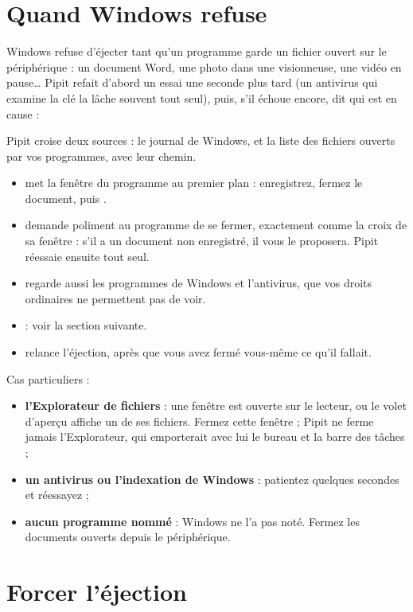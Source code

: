 \section{Quand Windows refuse}\label{sec:refus}

Windows refuse d'éjecter tant qu'un programme garde un fichier ouvert sur le
périphérique : un document Word, une photo dans une visionneuse, une vidéo en pause…
Pipit refait d'abord un essai une seconde plus tard (un antivirus qui examine la clé la
lâche souvent tout seul), puis, s'il échoue encore, dit qui est en cause :


Pipit croise deux sources : le journal de Windows, et la liste des fichiers ouverts par
vos programmes, avec leur chemin.

\begin{itemize}
\item {} met la fenêtre du programme au premier plan : enregistrez,
  fermez le document, puis .
\item {} demande poliment au programme de se fermer, exactement comme la
  croix de sa fenêtre : s'il a un document non enregistré, il vous le proposera. Pipit
  réessaie ensuite tout seul.
\item {} regarde aussi les programmes de Windows et l'antivirus,
  que vos droits ordinaires ne permettent pas de voir.
\item {} : voir la section suivante.
\item {} relance l'éjection, après que vous avez fermé vous-même ce qu'il
  fallait.
\end{itemize}

Cas particuliers :
\begin{itemize}
\item \textbf{l'Explorateur de fichiers} : une fenêtre est ouverte sur le lecteur, ou le
  volet d'aperçu affiche un de ses fichiers. Fermez cette fenêtre ; Pipit ne ferme jamais
  l'Explorateur, qui emporterait avec lui le bureau et la barre des tâches ;
\item \textbf{un antivirus ou l'indexation de Windows} : patientez quelques secondes et
  réessayez ;
\item \textbf{aucun programme nommé} : Windows ne l'a pas noté. Fermez les documents
  ouverts depuis le périphérique.
\end{itemize}

\section{Forcer l'éjection}\label{sec:forcer}

